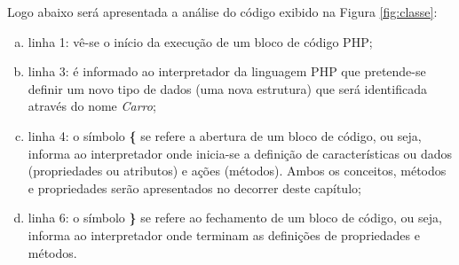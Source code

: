 \FloatBarrier 	%

Logo abaixo será apresentada a análise do código exibido na
Figura \ref{fig:classe}:

\begin{enumerate}[a)]
    \item linha 1: vê-se o início da execução de um bloco de código
    PHP;
    \item linha 3: é informado ao interpretador da linguagem \acs{PHP} que
    pretende-se definir um novo tipo de dados (uma nova estrutura) que será
    identificada através do nome \textit{Carro};
    \item linha 4: o símbolo \textbf{\{} se refere a abertura de um
    bloco de código, ou seja, informa ao interpretador onde inicia-se a definição de
    características ou dados (propriedades ou atributos) e ações (métodos).
    Ambos os conceitos, métodos e propriedades serão apresentados no decorrer
    deste capítulo;
    \item linha 6: o símbolo \textbf{\}} se refere ao fechamento de um
    bloco de código, ou seja, informa ao interpretador onde terminam as
    definições de propriedades e métodos.
\end{enumerate}